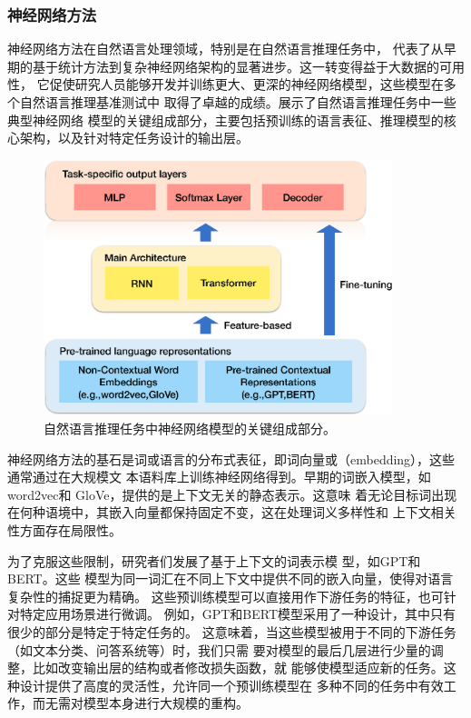 \subsubsection{神经网络方法}
神经网络方法在自然语言处理领域，特别是在自然语言推理任务中，
代表了从早期的基于统计方法到复杂神经网络架构的显著进步。这一转变得益于大数据的可用性，
它促使研究人员能够开发并训练更大、更深的神经网络模型，这些模型在多个自然语言推理基准测试中
取得了卓越的成绩。展示了自然语言推理任务中一些典型神经网络
模型的关键组成部分，主要包括预训练的语言表征、推理模型的核心架构，以及针对特定任务设计的输出层。

\begin{figure}[th]
\centering\includegraphics[width=4in]{figures/xulun/neuralmodel.eps}
\caption{自然语言推理任务中神经网络模型的关键组成部分。}
\label{fig1:neuralmodel}
\end{figure}

神经网络方法的基石是词或语言的分布式表征，即词向量或（embedding），这些通常通过在大规模文
本语料库上训练神经网络得到。早期的词嵌入模型，如word2vec\cite{mikolov2013distributed}和
GloVe\cite{pennington2014glove}，提供的是上下文无关的静态表示。这意味
着无论目标词出现在何种语境中，其嵌入向量都保持固定不变，这在处理词义多样性和
上下文相关性方面存在局限性。

为了克服这些限制，研究者们发展了基于上下文的词表示模
型，如GPT\cite{radford2018improving}和BERT\cite{devlin2018bert}。这些
模型为同一词汇在不同上下文中提供不同的嵌入向量，使得对语言复杂性的捕捉更为精确。
这些预训练模型可以直接用作下游任务的特征，也可针对特定应用场景进行微调。
例如，GPT和BERT模型采用了一种设计，其中只有很少的部分是特定于特定任务的。
这意味着，当这些模型被用于不同的下游任务（如文本分类、问答系统等）时，我们只需
要对模型的最后几层进行少量的调整，比如改变输出层的结构或者修改损失函数，就
能够使模型适应新的任务。这种设计提供了高度的灵活性，允许同一个预训练模型在
多种不同的任务中有效工作，而无需对模型本身进行大规模的重构。

